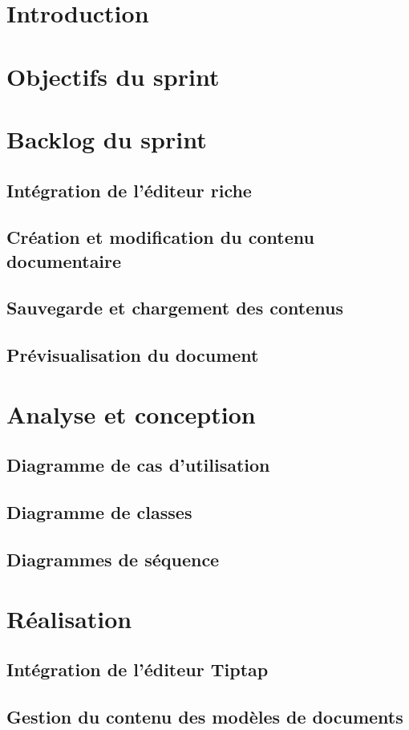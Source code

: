 \documentclass[12pt,a4paper]{report}
\begin{document}
\section{Introduction}
\section{Objectifs du sprint}
\section{Backlog du sprint}
\subsection{Intégration de l'éditeur riche}
\subsection{Création et modification du contenu documentaire}
\subsection{Sauvegarde et chargement des contenus}
\subsection{Prévisualisation du document}
\section{Analyse et conception}
\subsection{Diagramme de cas d'utilisation}
\subsection{Diagramme de classes}
\subsection{Diagrammes de séquence}
\section{Réalisation}
\subsection{Intégration de l'éditeur Tiptap}
\subsection{Gestion du contenu des modèles de documents}
\end{document}
